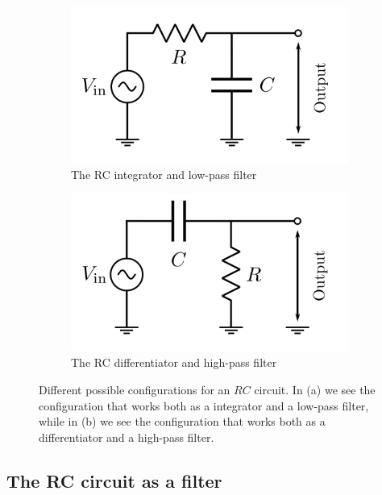 \begin{figure}
    \centering
    \begin{subfigure}[b]{0.45\textwidth}
        \centering
        \includegraphics[width=\textwidth]{figs/electronics-circuits/RCLP.png}
        \caption{The RC integrator and low-pass filter}
        \label{fig:rc-lp}
    \end{subfigure}\hfill
    \begin{subfigure}[b]{0.45\textwidth}
        \centering
        \includegraphics[width=\textwidth]{figs/electronics-circuits/RCHP.png}
        \caption{The RC differentiator and high-pass filter}
        \label{fig:rc-hp}
    \end{subfigure}
    \caption{Different possible configurations for an $RC$ circuit. In (a) we see the configuration that works both as a integrator and a low-pass filter, while in (b) we see the configuration that works both as a differentiator and a high-pass filter.}
    \label{fig:RC-configs}
\end{figure}

\subsection*{The RC circuit as a filter}


